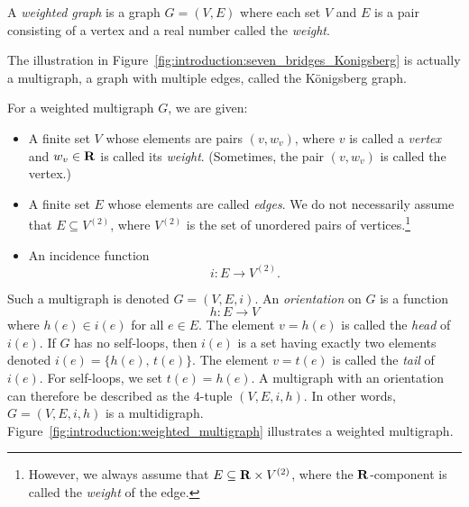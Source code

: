 \begin{definition}
\rm
A \emph{weighted graph} is a graph $G = (V, E)$
where each set $V$ and $E$ is a pair consisting of a vertex and a real
number called the \emph{weight}.
\end{definition}

The illustration in
Figure~\ref{fig:introduction:seven_bridges_Konigsberg} is actually a
multigraph, a graph with multiple edges, called the
K\"onigsberg graph.

\begin{definition}
\label{def:introduction:graph-version3}
\rm
For a weighted multigraph $G$, we are
given:
\begin{itemize}
\item A finite set $V$ whose elements are pairs $(v, w_v)$, where $v$
  is called a \emph{vertex} and $w_v \in \mathbf{R}$
  is called its \emph{weight}. (Sometimes,
  the pair $(v, w_v)$ is called the vertex.)

\item A finite set $E$ whose elements are called
  \emph{edges}. We do not necessarily assume
  that $E \subseteq V^{(2)}$, where $V^{(2)}$ is the set of unordered
  pairs of
  vertices.\footnote{
    However, we always assume that $E \subseteq \mathbf{R} \times V^{(2)}$,
    where the $\mathbf{R}$-component is called the
    \emph{weight} of the edge.
  }

\item An incidence function
\begin{equation}
\label{eqn:introduction:edge_incidence}
i: E \to V^{(2)}.
\end{equation}
\end{itemize}
Such a multigraph is denoted $G = (V,E,i)$. An
\emph{orientation} on $G$ is a function
\begin{equation}
\label{eqn:introduction:edge_orientation}
h: E \to V
\end{equation}
where $h(e) \in i(e)$ for all $e \in E$. The element $v = h(e)$ is
called the \emph{head} of $i(e)$. If $G$ has no
self-loops, then $i(e)$ is a set having exactly two elements denoted
$i(e) = \{h(e),\, t(e)\}$. The element $v = t(e)$ is called the
\emph{tail} of $i(e)$. For self-loops, we set
$t(e) = h(e)$. A multigraph with an orientation can
therefore be described as the $4$-tuple $(V, E, i, h)$. In other
words, $G = (V,E,i,h)$ is a multidigraph.
Figure~\ref{fig:introduction:weighted_multigraph} illustrates a
weighted multigraph.
\end{definition}

